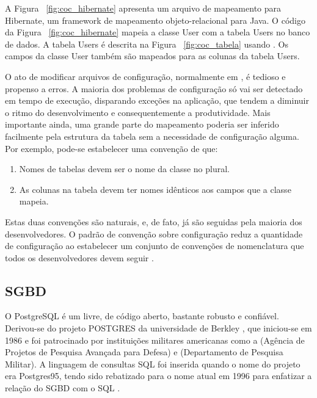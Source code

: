 A Figura ~\ref{fig:coc_hibernate} apresenta um arquivo de mapeamento para Hibernate,
um framework de mapeamento objeto-relacional para Java. O código da Figura ~\ref{fig:coc_hibernate}
mapeia a classe User com a tabela Users no banco de dados. A tabela Users é descrita 
na Figura ~\ref{fig:coc_tabela} usando . Os campos da classe User também são mapeados
para as colunas da tabela Users.

O ato de modificar arquivos de configuração, normalmente em , é tedioso e propenso
a erros. A maioria dos problemas de configuração só vai ser detectado em tempo de execução,
disparando exceções na aplicação, que tendem a diminuir o ritmo do desenvolvimento e 
consequentemente a produtividade. Mais importante ainda, uma grande parte do
mapeamento poderia ser inferido facilmente pela estrutura da tabela sem a necessidade
de configuração alguma. Por exemplo, pode-se estabelecer uma convenção de que:
\begin{enumerate}
\item Nomes de tabelas devem ser o nome da classe no plural.
\item As colunas na tabela devem ter nomes idênticos aos campos que a classe mapeia.
\end{enumerate}

Estas duas convenções são naturais, e, de fato, já são seguidas pela maioria dos desenvolvedores.
O padrão de convenção sobre configuração reduz a quantidade de configuração ao estabelecer
um conjunto de convenções de nomenclatura que todos os desenvolvedores devem seguir \cite{Chen}.

\subsection{SGBD}
O PostgreSQL é um  livre, de código aberto,
bastante robusto e confiável. Derivou-se do projeto POSTGRES da universidade de Berkley \cite{Stonebraker:1986:DP:16856.16888}, que 
iniciou-se em 1986 e foi patrocinado por instituições militares americanas como a 
 (Agência de Projetos de Pesquisa Avançada para Defesa) e  (Departamento de Pesquisa Militar).
A linguagem de consultas SQL foi inserida quando o nome do projeto era Postgres95, tendo sido
rebatizado para o nome atual em 1996 para enfatizar a relação do SGBD com o SQL \cite{postgresql}.

